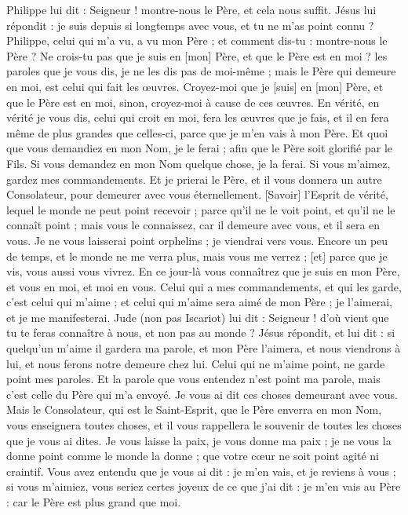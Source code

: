 \begin{multicols}{2}
Philippe lui dit : Seigneur ! montre-nous le Père, et cela nous suffit.
Jésus lui répondit : je suis depuis si longtemps avec vous, et tu ne m'as point connu ? Philippe, celui qui m'a vu, a vu mon Père ; et comment dis-tu : montre-nous le Père ?
Ne crois-tu pas que je suis en [mon] Père, et que le Père est en moi ? les paroles que je vous dis, je ne les dis pas de moi-même ; mais le Père qui demeure en moi, est celui qui fait les œuvres.
Croyez-moi que je [suis] en [mon] Père, et que le Père est en moi, sinon, croyez-moi à cause de ces œuvres.
En vérité, en vérité je vous dis, celui qui croit en moi, fera les œuvres que je fais, et il en fera même de plus grandes que celles-ci, parce que je m'en vais à mon Père.
Et quoi que vous demandiez en mon Nom, je le ferai ; afin que le Père soit glorifié par le Fils.
Si vous demandez en mon Nom quelque chose, je la ferai.
Si vous m'aimez, gardez mes commandements.
Et je prierai le Père, et il vous donnera un autre Consolateur, pour demeurer avec vous éternellement.
[Savoir] l'Esprit de vérité, lequel le monde ne peut point recevoir ; parce qu'il ne le voit point, et qu'il ne le connaît point ; mais vous le connaissez, car il demeure avec vous, et il sera en vous.
Je ne vous laisserai point orphelins ; je viendrai vers vous.
Encore un peu de temps, et le monde ne me verra plus, mais vous me verrez ; [et] parce que je vis, vous aussi vous vivrez.
En ce jour-là vous connaîtrez que je suis en mon Père, et vous en moi, et moi en vous.
Celui qui a mes commandements, et qui les garde, c'est celui qui m'aime ; et celui qui m'aime sera aimé de mon Père ; je l'aimerai, et je me manifesterai.
Jude (non pas Iscariot) lui dit : Seigneur ! d'où vient que tu te feras connaître à nous, et non pas au monde ?
Jésus répondit, et lui dit : si quelqu'un m'aime il gardera ma parole, et mon Père l'aimera, et nous viendrons à lui, et nous ferons notre demeure chez lui.
Celui qui ne m'aime point, ne garde point mes paroles. Et la parole que vous entendez n'est point ma parole, mais c'est celle du Père qui m'a envoyé.
Je vous ai dit ces choses demeurant avec vous.
Mais le Consolateur, qui est le Saint-Esprit, que le Père enverra en mon Nom, vous enseignera toutes choses, et il vous rappellera le souvenir de toutes les choses que je vous ai dites.
Je vous laisse la paix, je vous donne ma paix ; je ne vous la donne point comme le monde la donne ; que votre cœur ne soit point agité ni craintif.
Vous avez entendu que je vous ai dit : je m'en vais, et je reviens à vous ; si vous m'aimiez, vous seriez certes joyeux de ce que j'ai dit : je m'en vais au Père : car le Père est plus grand que moi.

\end{multicols}
